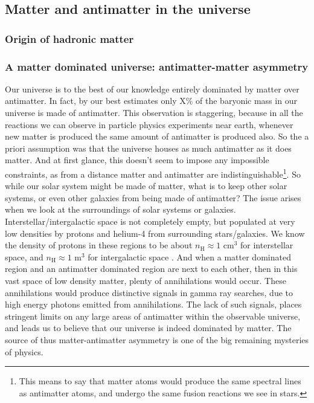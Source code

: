 \subsection{Matter and antimatter in the universe}


\subsubsection{Origin of hadronic matter}

\subsubsection{A matter dominated universe: antimatter-matter asymmetry}
Our universe is to the best of our knowledge entirely dominated by matter over antimatter. In fact, by our best estimates only X\% of the baryonic mass in our universe is made of antimatter. This observation is staggering, because in all the reactions we can observe in particle physics experiments near earth, whenever new matter is produced the same amount of antimatter is produced also\cite{}. So the a priori assumption was that the universe houses as much antimatter as it does matter. And at first glance, this doesn't seem to impose any impossible constraints, as from a distance matter and antimatter are indistinguishable\footnote{This means to say that matter atoms would produce the same spectral lines as antimatter atoms, and undergo the same fusion reactions we see in stars.}. So while our solar system might be made of matter, what is to keep other solar systems, or even other galaxies from being made of antimatter? The issue arises when we look at the surroundings of solar systems or galaxies. Interstellar/intergalactic space is not completely empty, but populated at very low densities by protons and helium-4 from surrounding stars/galaxies. We know the density of protons in these regions to be about $n_\mathrm{H} \approx 1$ cm$^3$ for interstellar space\cite{}, and $n_\mathrm{H} \approx 1$ m$^3$ for intergalactic space \cite{}. And when a matter dominated region and an antimatter dominated region are next to each other, then in this vast space of low density matter, plenty of annihilations would occur. These annihilations would produce distinctive signals in gamma ray searches\cite{}, due to high energy photons emitted from annihilations. The lack of such signals\cite{}, places stringent limits on any large areas of antimatter within the observable universe, and leads us to believe that our universe is indeed dominated by matter. The source of thus matter-antimatter asymmetry is one of the big remaining mysteries of physics.  \\

